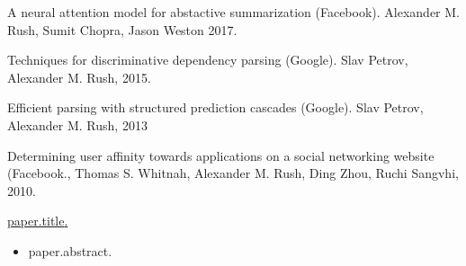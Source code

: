 \documentclass[10pt]{article}
\begin{document}
{\bigskip
{}

\ind A neural attention model for abstactive summarization (Facebook). Alexander M. Rush, Sumit Chopra, Jason Weston 2017.
\medskip

\ind Techniques for discriminative dependency parsing (Google). Slav Petrov, Alexander M. Rush, 2015.
\medskip

\ind Efficient parsing with structured prediction cascades (Google). Slav Petrov, Alexander M. Rush, 2013
\medskip

\ind  Determining user affinity towards applications on a social networking website (Facebook., Thomas S. Whitnah, Alexander M. Rush, Ding Zhou, Ruchi Sangvhi, 2010.



\bigskip


\bigskip
{%
\ind \href{ paper.link } { {{paper.title}}. }
\begin{itemize}
	\item {{paper.abstract}}.
\end{itemize}
\medskip

{%










}}}
\end{document}
